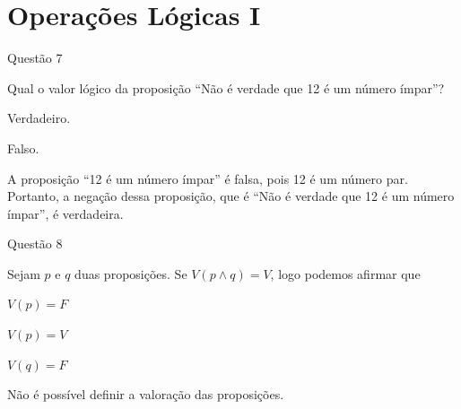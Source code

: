 \chapter{Operações Lógicas I}

\begin{questao}{Questão 7}

Qual o valor lógico da proposição ``Não é verdade que 12 é um número ímpar''?

\begin{alternativas}
    \item Verdadeiro.
    \item Falso.
\end{alternativas}

\end{questao}

\begin{comentario_questao}

    A proposição ``12 é um número ímpar'' é falsa, pois 12 é um número par. Portanto, a negação dessa proposição, que é ``Não é verdade que 12 é um número ímpar'', é verdadeira.


\end{comentario_questao}

\newpage

\begin{questao}{Questão 8}

Sejam $p$ e $q$ duas proposições. Se $V(p \wedge q) = V$, logo podemos afirmar que

\begin{alternativas}
    \item $V(p) = F$
    \item $V(p) = V$
    \item $V(q) = F$
    \item Não é possível definir a valoração das proposições.
\end{alternativas}

\end{questao}

\begin{comentario_questao}






\end{comentario_questao}

